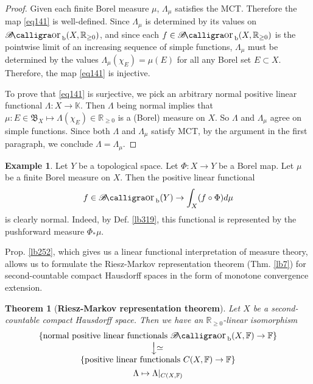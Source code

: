 \documentclass[12pt,b5paper,notitlepage]{article}
\theoremstyle{definition}
\newtheorem{eg}[df]{Example}
\theoremstyle{plain}
\newtheorem{thm}[df]{Theorem}
\DeclareMathOperator{\Borb}{{\mathscr{B}\text{\kern -2pt {\calligra\large or}}\,}_{\mathrm b}}
\newcommand{\fk}{\mathfrak}
\newcommand{\Kbb}{\mathbb K}
\newcommand{\Rbb}{\mathbb R}
\newcommand{\Fbb}{\mathbb F}
\numberwithin{equation}{section}
\begin{document}
\begin{proof}
Given each finite Borel measure $\mu$, $\Lambda_\mu$ satisfies the MCT. Therefore the map \eqref{eq141} is well-defined. Since $\Lambda_\mu$ is determined by its values on $\Borb(X,\Rbb_{\geq0})$, and since each $f\in\Borb(X,\Rbb_{\geq0})$ is the pointwise limit of an increasing sequence of simple functions, $\Lambda_\mu$ must be determined by the values $\Lambda_\mu(\chi_E)=\mu(E)$ for all any Borel set $E\subset X$. Therefore, the map \eqref{eq141} is injective.

To prove that \eqref{eq141} is surjective, we pick an arbitrary normal positive linear functional $\Lambda:X\rightarrow\Kbb$. Then $\Lambda$ being normal implies that $\mu:E\in\fk B_X\mapsto \Lambda(\chi_E)\in\Rbb_{\geq0}$ is a (Borel) measure on $X$. So $\Lambda$ and $\Lambda_\mu$ agree on simple functions. Since both $\Lambda$ and $\Lambda_\mu$ satisfy MCT, by the argument in the first paragraph, we conclude $\Lambda=\Lambda_\mu$.
\end{proof}


\begin{eg}\label{lb318}
Let $Y$ be a topological space. Let $\Phi:X\rightarrow Y$ be a Borel map. Let $\mu$ be a finite Borel measure on $X$. Then the positive linear functional
\begin{align*}
f\in\Borb(Y)\rightarrow \int_X (f\circ\Phi)d\mu
\end{align*}
is clearly normal. Indeed, by Def. \ref{lb319}, this functional is represented by the pushforward measure $\Phi_*\mu$.
\end{eg}


Prop. \ref{lb252}, which gives us a linear functional interpretation of measure theory, allows us to formulate the Riesz-Markov representation theorem (Thm. \ref{lb7}) for second-countable compact Hausdorff spaces in the form of monotone convergence extension.


\begin{thm}[\textbf{Riesz-Markov representation theorem}]\label{lb253} 
Let $X$ be a second-countable compact Hausdorff space. Then we have an $\Rbb_{\geq0}$-linear isomorphism
\begin{gather}
\begin{gathered}
\begin{array}{c}
\{\text{normal positive linear functionals $\Borb(X,\Fbb)\rightarrow\Fbb$}\}\\
\raisebox{0.3cm}{\rotatebox{-90}{$\xlongrightarrow{\rotatebox{90}{$\simeq$}}$}}\\
\{\text{positive linear functionals $C(X,\Fbb)\rightarrow\Fbb$}\}
\end{array}
\\
\Lambda\mapsto\Lambda|_{C(X,\Fbb)}
\end{gathered}
\end{gather}
\end{thm} 
\end{document}
